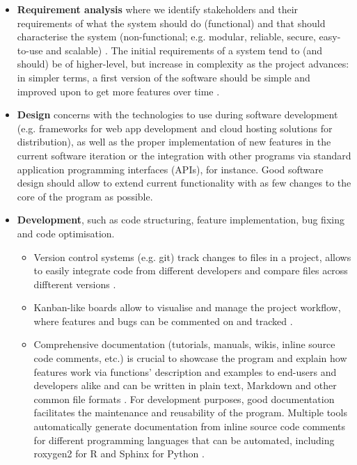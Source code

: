 \begin{itemize}
    \item{\textbf{Requirement analysis} where we identify stakeholders and their requirements of what the system should do (functional) and that should characterise the system (non-functional; e.g. modular, reliable, secure, easy-to-use and scalable) \cite{silva:2017wl,hewitt:2019uj}. The initial requirements of a system tend to (and should) be of higher-level, but increase in complexity as the project advances: in simpler terms, a first version of the software should be simple and improved upon to get more features over time \cite{silva:2017wl,kanat-alexander:2012ve}.}
    \item{\textbf{Design} concerns with the technologies to use during software development (e.g. frameworks for web app development and cloud hosting solutions for distribution), as well as the proper implementation of new features in the current software iteration or the integration with other programs via standard application programming interfaces (APIs), for instance. Good software design should allow to extend current functionality with as few changes to the core of the program as possible.}
	\item{\textbf{Development}, such as code structuring, feature implementation, bug fixing and code optimisation.}
	\begin{itemize}
	    \item Version control systems (e.g. git) track changes to files in a project, allows to easily integrate code from different developers and compare files across diffterent versions \cite{silva:2017wl,ford:2021ub}.
		\item Kanban-like boards allow to visualise and manage the project workflow, where features and bugs can be commented on and tracked \cite{silva:2017wl,hewitt:2019uj}.
		\item Comprehensive documentation (tutorials, manuals, wikis, inline source code comments, etc.) is crucial to showcase the program and explain how features work via functions' description and examples to end-users and developers alike and can be written in plain text, Markdown and other common file formats \cite{storer:2017tr,silva:2017wl,kanat-alexander:2012ve,ford:2021ub}. For development purposes, good documentation facilitates the maintenance and reusability of the program. Multiple tools automatically generate documentation from inline source code comments for different programming languages that can be automated, including roxygen2 for R \cite{wickham:2021wt} and Sphinx for Python \cite{silva:2017wl,hewitt:2019uj}.

\end{itemize}
\end{itemize}
